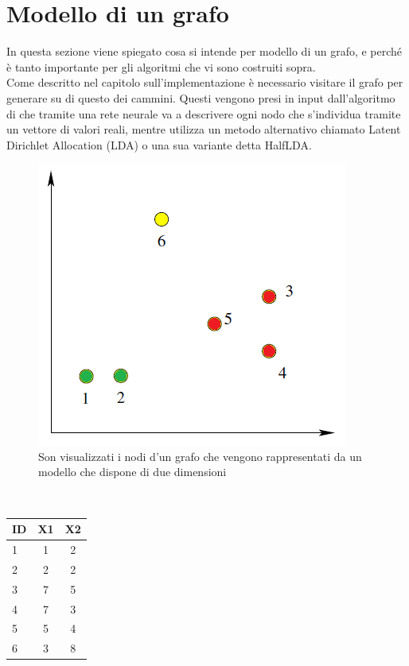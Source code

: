 \section{Modello di un grafo}
In questa sezione viene spiegato cosa si intende per modello di un grafo, e perché è tanto importante per gli algoritmi che vi sono costruiti sopra.\\
Come descritto nel capitolo sull'implementazione è necessario visitare il grafo per generare su di questo dei cammini. Questi vengono presi in input dall'algoritmo di \wv che tramite una rete neurale va a descrivere ogni nodo che s'individua tramite un vettore di valori reali, mentre \cnrl utilizza un metodo alternativo chiamato Latent Dirichlet Allocation (LDA)\cite{LDA} o una sua variante detta HalfLDA.\\
\begin{figure}[htp]
	\centering
	\includegraphics{immagini/punti_modello}
	\caption{Son visualizzati i nodi d'un grafo che vengono rappresentati da un modello che dispone di due dimensioni}
	\label{fig:grafico_modello}
\end{figure}
\\
\begin{center}
	\begin{tabular}{|l|cc|}
		\hline
		ID&X1&X2\\
		\hline
		1 & 1 & 2\\
		2 & 2 & 2\\
		3 & 7 & 5\\
		4 & 7 & 3\\
		5 & 5 & 4\\
		6 & 3 & 8\\
		\hline
	\end{tabular}
	\label{tab:coordinate_modello}
\end{center}
